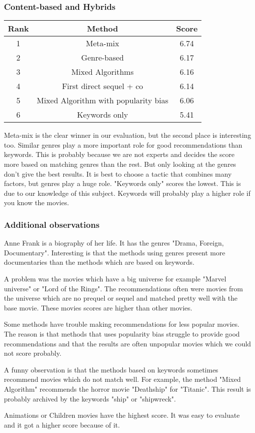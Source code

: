 \documentclass{article}
\begin{document}
\subsubsection{Content-based and Hybrids}
\begin{center}
 \begin{tabular}{||c | c | c||} 
 \hline
 Rank & Method & Score \\ [0.5ex] 
 \hline\hline
 1 & Meta-mix & 6.74 \\ 
 \hline
 2 & Genre-based & 6.17 \\
 \hline
 3 & Mixed Algorithms & 6.16 \\
 \hline
 4 & First direct sequel + co & 6.14 \\
 \hline
 5 & Mixed Algorithm with popularity bias& 6.06 \\ 
 \hline
 6 & Keywords only & 5.41 \\ 
 \hline
\end{tabular}
\end{center}
Meta-mix is the clear winner in our evaluation, but the second place is interesting too. Similar genres play a more important role for good recommendations than keywords. This is probably because we are not experts and decides the score more based on matching genres than the rest. But only looking at the genres don't give the best results. It is best to choose a tactic that combines many factors, but genres play a huge role. "Keywords only" scores the lowest. This is due to our knowledge of this subject. Keywords will probably play a higher role if you know the movies.
\subsubsection{Additional observations}
Anne Frank is a biography of her life. It has the genres "Drama, Foreign, Documentary". Interesting is that the methods using genres present more documentaries than the methods which are based on keywords.

A problem was the movies which have a big universe for example "Marvel universe" or "Lord of the Rings". The recommendations often were movies from the universe which are no prequel or sequel and matched pretty well with the base movie. These movies scores are higher than other movies. 

Some methods have trouble making recommendations for less popular movies. The reason is that methods that uses popularity bias struggle to provide good recommendations and that the results are often unpopular movies which we could not score probably.

A funny observation is that the methods based on keywords sometimes recommend movies which do not match well. For example, the method "Mixed Algorithm" recommends the horror movie "Deathship" for "Titanic". This result is probably archived by the keywords "ship" or "shipwreck".

Animations or Children movies have the highest score. It was easy to evaluate and it got a higher score because of it.
\end{document}
